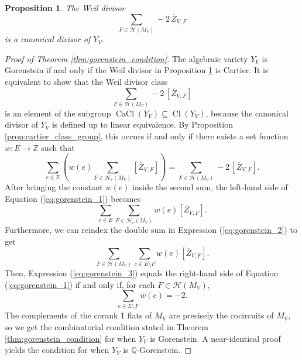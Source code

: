 \documentclass{amsart}
\theoremstyle{plain}
\newtheorem{proposition}[theorem]{Proposition}
\theoremstyle{definition}
\newcommand{\Cl}{\operatorname{Cl}}
\newcommand{\CaCl}{\operatorname{CaCl}}
\begin{document}
\begin{proposition}
\label{prop:canonical_divisor}
\cite[Proposition 4.4]{crowley_proudfoot}
The Weil divisor
\[\sum_{F \in \mathcal{H}(M_V)}-2\,\overline{Z}_{V,F}\]
is a canonical divisor of $Y_V.$
\end{proposition}

\begin{proof}[Proof of Theorem \ref{thm:gorenstein_condition}]

The algebraic variety $Y_V$ is Gorenstein if and only if the Weil divisor in Proposition \ref{prop:canonical_divisor} is Cartier. It is equivalent to show that the Weil divisor class 
\[\sum_{F \in \mathcal{H}(M_V)}-2 \, [\overline{Z}_{V,F}]\]
is an element of the subgroup $\CaCl(Y_V) \subseteq \Cl(Y_V)$, because the canonical divisor of $Y_V$ is defined up to linear equivalence. By Proposition \ref{prop:cartier_class_group}, this occurs if and only if there exists a set function $w: E \to \mathbb{Z}$ such that
\begin{equation}
\label{eq:gorenstein_1}
\sum_{e\in E} \left( w(e) \sum_{F \in \mathcal{H}_e(M_V)} [\overline{Z}_{V,F} ] \right)= \sum_{F \in \mathcal{H}(M_V)} -2 \,[\overline{Z}_{V,F}].
\end{equation}
After bringing the constant $w(e)$ inside the second sum, the left-hand side of Equation (\ref{eq:gorenstein_1}) becomes
\begin{equation}
\label{eq:gorenstein_2}
\sum_{e\in E}\sum_{F \in \mathcal{H}_e(M_V)} w(e)[\overline{Z}_{V,F} ].
\end{equation}
Furthermore, we can reindex the double sum in Expression (\ref{eq:gorenstein_2}) to get
\begin{equation}
\label{eq:gorenstein_3}
\sum_{F \in \mathcal{H}(M_V)} \sum_{e \in E \setminus F} w(e)[\overline{Z}_{V,F}].
\end{equation}
Then, Expression (\ref{eq:gorenstein_3}) equals the right-hand side of Equation (\ref{eq:gorenstein_1}) if and only if, for each $F \in \mathcal{H}(M_V)$,
\[
    \sum_{e \in E \setminus F} w(e) = -2.
\]
The complements of the corank 1 flats of $M_V$ are precisely the cocircuits of $M_V$, so we get the combinatorial condition stated in Theorem \ref{thm:gorenstein_condition} for when $Y_V$ is Gorenstein. A near-identical proof yields the condition for when $Y_V$ is $\mathbb{Q}$-Gorenstein.
\end{proof}

\appendix
\end{document}
